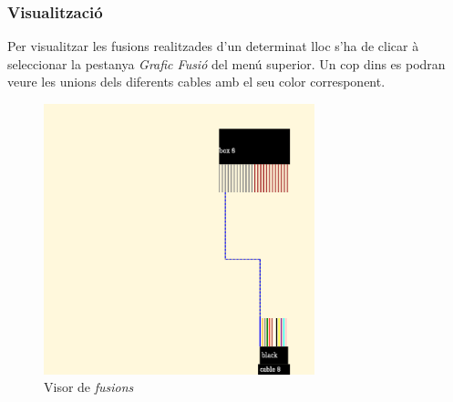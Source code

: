 \documentclass[a4paper]{article}
\begin{document}
	\subsubsection{Visualització}
	Per visualitzar les fusions realitzades d'un determinat lloc s'ha de clicar à seleccionar la pestanya \emph{Grafic Fusió} del menú superior. Un cop dins es podran veure les unions dels diferents cables amb el seu color corresponent.
	
	\begin{figure}[H]
		\centering
		\includegraphics[width=0.7\textwidth]{images/fusions_diagram.png}
		\caption{Visor de \emph{fusions}}
	\end{figure}
\end{document}
